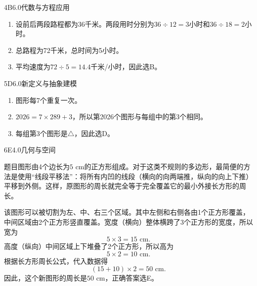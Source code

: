 \begin{solution}{4}{B}{6.0}{代数与方程应用}
\begin{enumerate}[label=\textbf{Step \arabic*:},leftmargin=*]
  \item 设前后两段路程都为36千米。两段用时分别为\(36\div12=3\)小时和\(36\div18=2\)小时。
  \item 总路程为72千米，总时间为5小时。
  \item 平均速度为\(72\div5=14.4\)千米/小时，因此选B。
\end{enumerate}
\end{solution}

\begin{solution}{5}{D}{6.0}{新定义与抽象建模}
\begin{enumerate}[label=\textbf{Step \arabic*:},leftmargin=*]
  \item 图形每7个重复一次。
  \item \(2026=7\times289+3\)，所以第2026个图形与每组中的第3个相同。
  \item 每组第3个图形是\(\triangle\)，因此选D。
\end{enumerate}
\end{solution}

\begin{solution}{6}{E}{4.0}{几何与空间}

题目图形由4个边长为\(5\text{ cm}\)的正方形组成。对于这类不规则的多边形，最简便的方法是使用“线段平移法”：将所有内凹的线段（横向的向两端推，纵向的向上下推）平移到外侧。这样，原图形的周长就完全等于完全覆盖它的最小外接长方形的周长。

该图形可以被切割为左、中、右三个区域。其中左侧和右侧各由1个正方形覆盖，中间区域由2个正方形竖直覆盖。宽度（横向）整体横跨了3个正方形的宽度，所以宽为
\[
  5\times3=15\text{ cm}.
\]
高度（纵向）中间区域上下堆叠了2个正方形，所以高为
\[
  5\times2=10\text{ cm}.
\]
根据长方形周长公式，代入数据得
\[
  (15+10)\times2=50\text{ cm}.
\]
因此，这个新图形的周长是\(50\text{ cm}\)，正确答案选E。

\end{solution}

